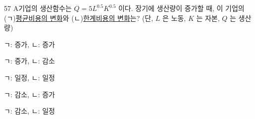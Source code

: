 \begin{question}{57}
A기업의 생산함수는 $Q=5L^{0.5}K^{0.5}$ 이다. 장기에 생산량이 증가할 때, 이 기업의 (ㄱ)\uline{평균비용의 변화}와 (ㄴ)\uline{한계비용의 변화}는? (단, $L$ 은 노동, $K$ 는 자본, $Q$ 는 생산량)
\begin{choices}
  \item ㄱ: 증가, ㄴ: 증가
  \item ㄱ: 증가, ㄴ: 감소
  \item ㄱ: 일정, ㄴ: 일정
  \item ㄱ: 감소, ㄴ: 증가
  \item ㄱ: 감소, ㄴ: 일정
\end{choices}
\end{question}
